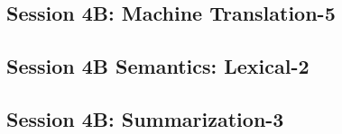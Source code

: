 \subsection{\large Session 4B: Machine Translation-5}
\label{parallel-session-4B-trackE}
\TrackELoc\hfill\sessionchair{}{}
\clearpage
\subsection{\large Session 4B Semantics: Lexical-2}
\label{parallel-session-4B-trackF}
\TrackFLoc\hfill\sessionchair{}{}
\clearpage
\subsection{\large Session 4B: Summarization-3}
\label{parallel-session-4B-trackG}
\TrackGLoc\hfill\sessionchair{}{}
\clearpage


